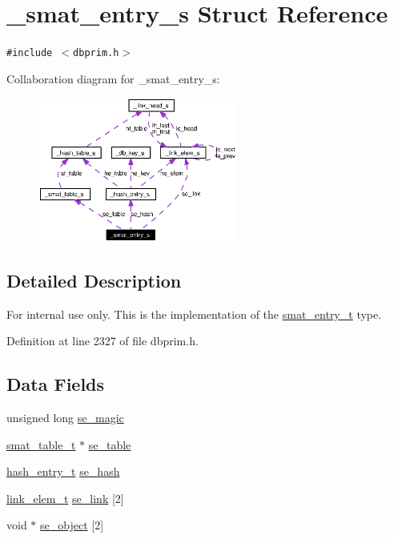 \hypertarget{struct__smat__entry__s}{
\section{\_\-smat\_\-entry\_\-s Struct Reference}
\label{struct__smat__entry__s}
}
{\tt \#include $<$dbprim.h$>$}

Collaboration diagram for \_\-smat\_\-entry\_\-s:\begin{figure}[H]
\begin{center}
\leavevmode
\includegraphics[width=186pt]{struct__smat__entry__s__coll__graph}
\end{center}
\end{figure}


\subsection{Detailed Description}
\begin{Desc}
\item[For internal use only.]
This is the implementation of the \hyperlink{group__dbprim__smat_ga2}{smat\_\-entry\_\-t} type.\end{Desc}




Definition at line 2327 of file dbprim.h.\subsection*{Data Fields}
\begin{CompactItemize}
\item 
unsigned long \hyperlink{struct__smat__entry__s_o0}{se\_\-magic}
\item 
\hyperlink{struct__smat__table__s}{smat\_\-table\_\-t} $\ast$ \hyperlink{struct__smat__entry__s_o1}{se\_\-table}
\item 
\hyperlink{struct__hash__entry__s}{hash\_\-entry\_\-t} \hyperlink{struct__smat__entry__s_o2}{se\_\-hash}
\item 
\hyperlink{struct__link__elem__s}{link\_\-elem\_\-t} \hyperlink{struct__smat__entry__s_o3}{se\_\-link} \mbox{[}2\mbox{]}
\item 
void $\ast$ \hyperlink{struct__smat__entry__s_o4}{se\_\-object} \mbox{[}2\mbox{]}
\end{CompactItemize}


